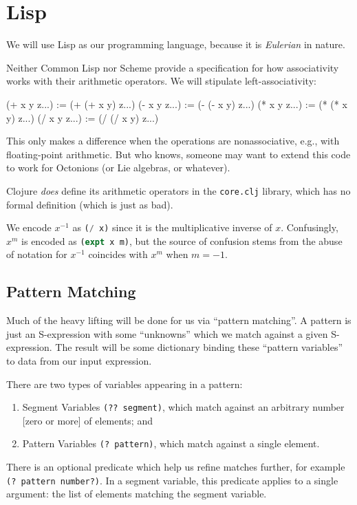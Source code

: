 \chapter{Lisp}

\M
We will use Lisp as our programming language, because it is
\emph{Eulerian} in nature.

Neither Common Lisp nor Scheme provide a specification for how
associativity works with their arithmetic operators. We will stipulate
left-associativity:

\begin{lisp-example}
(+ x y z...) := (+ (+ x y) z...)
(- x y z...) := (- (- x y) z...)
(* x y z...) := (* (* x y) z...)
(/ x y z...) := (/ (/ x y) z...)
\end{lisp-example}

\begin{remark}
This only makes a difference when the operations are nonassociative,
e.g., with floating-point arithmetic. But who knows, someone may want to
extend this code to work for Octonions (or Lie algebras, or whatever).
\end{remark}

\begin{remark}
Clojure \emph{does} define its arithmetic operators in the
\verb#core.clj# library, which has no formal definition (which is just
as bad).
\end{remark}

We encode $x^{-1}$ as \lstinline[language=lisp]{(/ x)} since it is the
multiplicative inverse of $x$. Confusingly, $x^{m}$ is encoded as
\lstinline[language=lisp]{(expt x m)}, but the source of confusion stems
from the abuse of notation for $x^{-1}$ coincides with $x^{m}$ when $m=-1$.

\section{Pattern Matching}

\M
Much of the heavy lifting will be done for us via ``pattern matching''.
A pattern is just an S-expression with some ``unknowns'' which we match
against a given S-expression. The result will be some dictionary binding
these ``pattern variables'' to data from our input expression.

There are two types of variables appearing in a pattern:
\begin{enumerate}
\item Segment Variables \lstinline[language=lisp]{(?? segment)}, which
  match against an arbitrary number [zero or more] of elements; and
\item Pattern Variables \lstinline[language=lisp]{(? pattern)}, which match against a single element.
\end{enumerate}
There is an optional predicate which help us refine matches further, for
example
\lstinline[language=lisp]{(? pattern number?)}. In a segment variable,
this predicate applies to a single argument: the list of elements
matching the segment variable.


